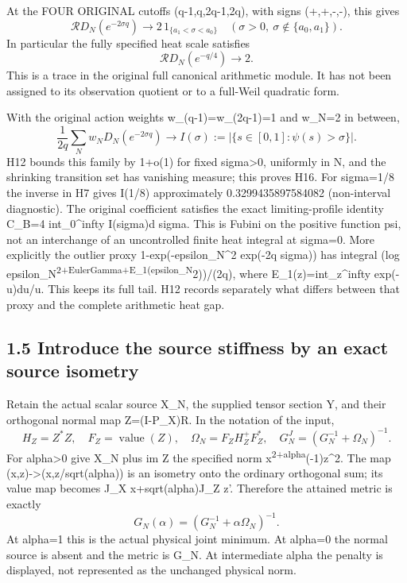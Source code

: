 At the FOUR ORIGINAL cutoffs (q-1,q,2q-1,2q), with signs (+,+,-,-), this gives \[
 \boxed{\mathcal R D_N(e^{-2\sigma q})\longrightarrow
 2\,1_{\{a_1<\sigma<a_0\}}\quad(\sigma>0,\ \sigma\notin\{a_0,a_1\}).}
 \tag{H14}
\] In particular the fully specified heat scale satisfies \[
 \boxed{\mathcal R D_N(e^{-q/4})\longrightarrow2.}\tag{H15}
\] This is a trace in the original full canonical arithmetic module. It has not been assigned to its observation quotient or to a full-Weil quadratic form.

With the original action weights w\_(q-1)=w\_(2q-1)=1 and w\_N=2 in between, \[
 \frac1{2q}\sum_Nw_N D_N(e^{-2\sigma q})\longrightarrow
 I(\sigma):=|\{s\in[0,1]:\psi(s)>\sigma\}|.
 \tag{H16}
\] H12 bounds this family by 1+o(1) for fixed sigma\textgreater0, uniformly in N, and the shrinking transition set has vanishing measure; this proves H16. For sigma=1/8 the inverse in H7 gives I(1/8) approximately 0.3299435897584082 (non-interval diagnostic). The original coefficient satisfies the exact limiting-profile identity C\_B=4 int\_0\^{}infty I(sigma)d sigma. This is Fubini on the positive function psi, not an interchange of an uncontrolled finite heat integral at sigma=0. More explicitly the outlier proxy 1-exp(-epsilon\_N\^{}2 exp(-2q sigma)) has integral (log epsilon\_N\textsuperscript{2+EulerGamma+E\_1(epsilon\_N}2))/(2q), where E\_1(z)=int\_z\^{}infty exp(-u)du/u. This keeps its full tail. H12 records separately what differs between that proxy and the complete arithmetic heat gap.

\subsection{1.5 Introduce the source stiffness by an exact source isometry}\label{introduce-the-source-stiffness-by-an-exact-source-isometry}

Retain the actual scalar source X\_N, the supplied tensor section Y, and their orthogonal normal map Z=(I-P\_X)R. In the notation of the input, \[
 H_Z=Z^*Z,\quad F_Z=\operatorname{value}(Z),\quad
 \Omega_N=F_ZH_Z^+F_Z^*,\quad
 G_N^J=(G_N^{-1}+\Omega_N)^{-1}.
\] For alpha\textgreater0 give X\_N plus im Z the specified norm \textbar\textbar x\textbar\textbar{}\textsuperscript{2+alpha}(-1)\textbar\textbar z\textbar\textbar\^{}2. The map (x,z)-\textgreater(x,z/sqrt(alpha)) is an isometry onto the ordinary orthogonal sum; its value map becomes J\_X x+sqrt(alpha)J\_Z z'. Therefore the attained metric is exactly \[
 \boxed{G_N(\alpha)=(G_N^{-1}+\alpha\Omega_N)^{-1}.}\tag{H17}
\] At alpha=1 this is the actual physical joint minimum. At alpha=0 the normal source is absent and the metric is G\_N. At intermediate alpha the penalty is displayed, not represented as the unchanged physical norm.

